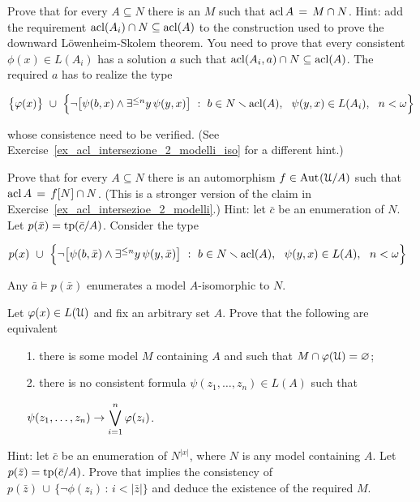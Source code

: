 \begin{exercise}\label{ex_acl_intersezioe_2_modelli}
Prove that for every $A\subseteq N$ there is an $M$ such that $\mathop{\rm acl} A\,=\,M\cap N$. Hint: add the requirement $\mathop{\rm acl}(A_i)\cap N\subseteq\mathop{\rm acl}(A)$ to the construction used to prove the downward L\"owenheim-Skolem theorem. You need to prove that every consistent $\phi(x)\in L(A_i)$ has a solution $a$ such that $\mathop{\rm acl}(A_i,a)\cap N\subseteq\mathop{\rm acl}(A)$. The required $a$ has to realize the type

\hfil$\big\{\phi(x)\big\}\ \cup\ \Big\{\neg\big[\psi(b,x)\wedge\E^{\le n}y\,\psi(y,x)\big]\ :\ b\in N\sm\acl(A),\ \ \psi(y,x)\in L(A_i),\ \ n<\omega\Big\}$

whose consistence need to be verified. (See Exercise~\ref{ex_acl_intersezione_2_modelli_iso} for a different hint.)\QED%
\end{exercise}

\begin{exercise}\label{ex_acl_intersezione_2_modelli_iso}
Prove that for every $A\subseteq N$ there is an automorphism $f\in\textrm{Aut\kern.15ex}(\EuScript U/A)$ such that $\mathop{\rm acl} A\,=\,f[N]\cap N$. (This is a stronger version of the claim in Exercise~\ref{ex_acl_intersezioe_2_modelli}.) Hint: let $\bar c$ be an enumeration of $N$. Let $p(\bar x)={\rm tp}(\bar c/A)$. Consider the type

\hfil$p(x)\ \cup\ \Big\{\neg\big[\psi(b,\bar x)\wedge\E^{\le n}y\,\psi(y,\bar x)\big]\ :\ b\in N\sm\acl(A),\ \ \psi(y,x)\in L(A),\ \ n<\omega\Big\}$

Any $\bar a\models p(\bar x)$ enumerates a model $A$-isomorphic to $N$.\QED%
\end{exercise}


\begin{exercise}
Let $\varphi(x)\in L(\EuScript U)$ and fix an arbitrary set $A$. Prove that the following are equivalent
\begin{itemize}
\item[1.] there is some model $M$ containing $A$ and such that $M\cap\varphi(\EuScript U)=\varnothing$;
\item[2.] there is no consistent formula $\psi(z_1,\dots,z_n)\in L(A)$ such that

 \hfil$\displaystyle\psi(z_1,\dots,z_n)\rightarrow\bigvee^n_{i=1}\varphi(z_i)$.
\end{itemize}
Hint: let $\bar c$ be an enumeration of $N^{|x|}$, where $N$ is any model containing $A$. Let $p(\bar z)={\rm tp}(\bar c/A)$.  Prove that  implies the consistency of $p(\bar z)\,\cup\, \big\{\neg\phi(z_i)\, :\, i<|\bar z|\big\}$ and deduce the existence of the required $M$.\QED
\end{exercise}



